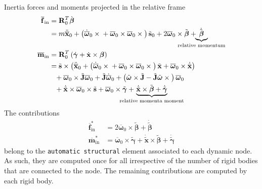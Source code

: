 \documentclass[10pt,dvips,fleqn,subeqn]{report}
\newcommand{\T}[1]{\bm{\mathbf{#1}}}
\newcommand{\TT}[1]{\bm{\mathbf{#1}}}
\begin{document}
Inertia forces and moments projected in the relative frame
\begin{subequations}
\begin{align}
	\overline{\T{f}}_{\text{in}}
	&= \TT{R}_0^T \dot{\T{\beta}}
	\nonumber \\
	&= m \ddot{\overline{\T{x}}}_0
	+ \plbr{
		\dot{\overline{\T{\omega}}}_0 \times{}
		+ \overline{\T{\omega}}_0 \times \overline{\T{\omega}}_0 \times{}
	} \tilde{\T{s}}_0
	+ 2 \overline{\T{\omega}}_0 \times \tilde{\T{\beta}}
	+ \hspace{-10mm}\underbrace{\dot{\tilde{\T{\beta}}}}_{\text{relative momentum}} \\
%
	\overline{\T{m}}_{\text{in}}
	&= \TT{R}_0^T \plbr{\dot{\T{\gamma}} + \dot{\T{x}} \times \T{\beta}}
	\nonumber \\
	&= \tilde{\T{s}} \times \plbr{
		\ddot{\overline{\T{x}}}_0
		+ \plbr{
			\dot{\overline{\T{\omega}}}_0 \times{}
			+ \overline{\T{\omega}}_0 \times \overline{\T{\omega}}_0 \times{}
		} \tilde{\T{x}}
		+ \overline{\T{\omega}}_0 \times \dot{\tilde{\T{x}}}
	}
	\nonumber \\
	&\hphantom{=}+ \overline{\T{\omega}}_0 \times \tilde{\TT{J}} \overline{\T{\omega}}_0
	+ \tilde{\TT{J}} \dot{\overline{\T{\omega}}}_0
	+ \plbr{
		\tilde{\T{\omega}} \times \tilde{\TT{J}}
		- \tilde{\TT{J}} \tilde{\T{\omega}} \times{}
	} \overline{\T{\omega}}_0
	\nonumber \\
	&\hphantom{=}
	+ \dot{\tilde{\T{x}}} \times \overline{\T{\omega}}_0 \times \tilde{\T{s}}
	+ \overline{\T{\omega}}_0 \times \tilde{\T{\gamma}}
	+ \hspace{-8mm}\underbrace{
		\dot{\tilde{\T{x}}} \times \tilde{\T{\beta}}
		+ \dot{\tilde{\T{\gamma}}}
	}_{\text{relative momenta moment}}
\end{align}
\end{subequations}
The contributions
\begin{subequations}
\begin{align}
	\overline{\T{f}}_{\text{in}}^*
	&= 2 \overline{\T{\omega}}_0 \times \tilde{\T{\beta}}
	+ \dot{\tilde{\T{\beta}}} \\
%
	\overline{\T{m}}_{\text{in}}^*
	&= \overline{\T{\omega}}_0 \times \tilde{\T{\gamma}}
	+ \dot{\tilde{\T{x}}} \times \tilde{\T{\beta}}
	+ \dot{\tilde{\T{\gamma}}}
\end{align}
\end{subequations}
belong to the \texttt{automatic structural} element associated
to each dynamic node.
As such, they are computed once for all irrespective of the number
of rigid bodies that are connected to the node.
The remaining contributions are computed by each rigid body.
\end{document}
